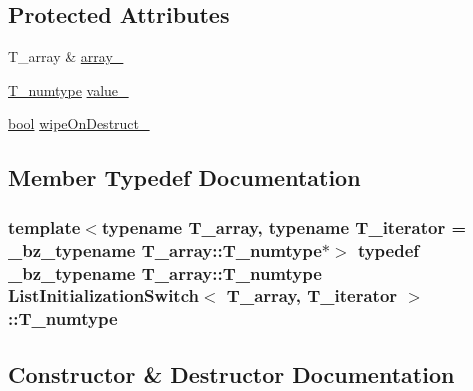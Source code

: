 \subsection*{Protected Attributes}
\begin{DoxyCompactItemize}
\item 
T\+\_\+array \& \hyperlink{classListInitializationSwitch_a376d96d286a26585bf025c3fd9a8cad4}{array\+\_\+}
\item 
\hyperlink{classListInitializationSwitch_ac93356c61fc683b281fe7eed00da55f4}{T\+\_\+numtype} \hyperlink{classListInitializationSwitch_a89b33e2549664fee19e796c8cee8a06f}{value\+\_\+}
\item 
\hyperlink{compiler_8h_abb452686968e48b67397da5f97445f5b}{bool} \hyperlink{classListInitializationSwitch_a7f44ada4e2b0abd813eb2acfc72c69cc}{wipe\+On\+Destruct\+\_\+}
\end{DoxyCompactItemize}


\subsection{Member Typedef Documentation}
\hypertarget{classListInitializationSwitch_ac93356c61fc683b281fe7eed00da55f4}{}
\subsubsection[{T\+\_\+numtype}]{\setlength{\rightskip}{0pt plus 5cm}template$<$typename T\+\_\+array, typename T\+\_\+iterator  = \+\_\+bz\+\_\+typename T\+\_\+array\+::\+T\+\_\+numtype$\ast$$>$ typedef {\bf \+\_\+bz\+\_\+typename} T\+\_\+array\+::\+T\+\_\+numtype {\bf List\+Initialization\+Switch}$<$ T\+\_\+array, T\+\_\+iterator $>$\+::{\bf T\+\_\+numtype}}\label{classListInitializationSwitch_ac93356c61fc683b281fe7eed00da55f4}


\subsection{Constructor \& Destructor Documentation}
\hypertarget{classListInitializationSwitch_af9cdfb54296b9b65c48eed25190a4dbe}{}
